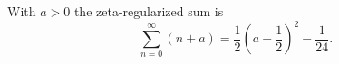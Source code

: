 \documentclass{article}
\begin{document}
With $a>0$ the zeta-regularized sum is
\begin{equation}
\sum_{n=0}^{\infty} (n+a) = \frac{1}{2}\left(a - \frac{1}{2}\right)^2 - \frac{1}{24} .
\label{eq:z}
\end{equation}
\end{document}
